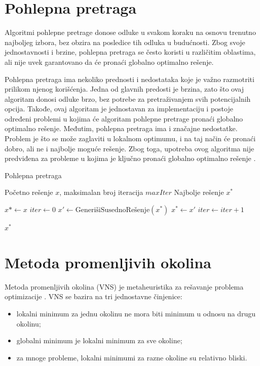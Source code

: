 \documentclass[12pt,oneside]{memoir}
\begin{document}
\section{Pohlepna pretraga}
Algoritmi pohlepne pretrage donose odluke u svakom koraku na osnovu trenutno najboljeg izbora, bez obzira na posledice tih odluka u budućnosti. Zbog svoje jednostavnosti i brzine, pohlepna pretraga se često koristi u različitim oblastima, ali nije uvek garantovano da će pronaći globalno optimalno rešenje.

Pohlepna pretraga ima nekoliko prednosti i nedostataka koje je važno razmotriti prilikom njenog korišćenja. Jedna od glavnih predosti je brzina, zato što ovaj algoritam donosi odluke brzo, bez potrebe za pretraživanjem svih potencijalnih opcija. Takođe, ovaj algoritam je jednostavan za implementaciju i postoje određeni problemi u kojima će algoritam pohlepne pretrage pronaći globalno optimalno rešenje. Međutim, pohlepna pretraga ima i značajne nedostatke. Problem je što se može zaglaviti u lokalnom optimumu, i na taj način će pronaći dobro, ali ne i najbolje moguće rešenje. Zbog toga, upotreba ovog algoritma nije predviđena za probleme u kojima je ključno pronaći globalno optimalno rešenje \cite{cormen2022}.\\

\begin{algorithm}
\caption{Pohlepna pretraga}
\renewcommand{\algorithmicrequire}{\textbf{Ulaz:}}
\renewcommand{\algorithmicensure}{\textbf{Izlaz:}}
    \begin{algorithmic}[1]
\REQUIRE Početno rešenje $x$, maksimalan broj iteracija $maxIter$
\ENSURE Najbolje rešenje $x^*$

\STATE $x* \gets x$
\STATE $iter \gets 0$
    \STATE $x' \gets \text{GenerišiSusednoRešenje}(x^*)$
        \STATE $x^* \gets x'$
    \ENDIF
    \STATE $iter \gets iter + 1$
\ENDWHILE

\RETURN $x^*$
\end{algorithmic}
\end{algorithm}

\section{Metoda promenljivih okolina}
Metoda promenljivih okolina (VNS) je metaheuristika za rešavanje problema optimizacije \cite{mladenovic1997}. 
VNS se bazira na tri jednostavne činjenice:
\begin{itemize}
    \item lokalni minimum za jednu okolinu ne mora biti minimum u odnosu na drugu okolinu;
    \item globalni minimum je lokalni minimum za sve okoline;
    \item za mnoge probleme, lokalni minimumi za razne okoline su relativno bliski.
\end{itemize}
\end{document}
